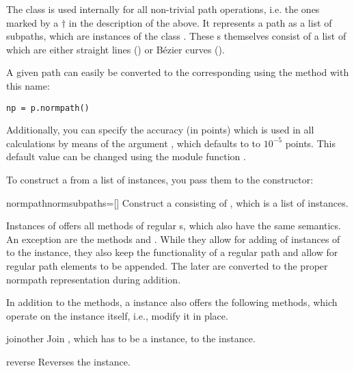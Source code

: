 \label{path:normpath}

The  class is used internally for all non-trivial path
operations, i.e. the ones marked by a $\dagger$ in the description of
the  above. It represents a path as a list of subpaths, which are
instances of the class . These s
themselves consist of a list of  which are
either straight lines () or B\'ezier curves
(). 

A given path can easily be converted to the corresponding 
using the method with this name:
\begin{verbatim}
np = p.normpath()
\end{verbatim}
Additionally, you can specify the accuracy (in points) which is used
in all  calculations by means of the argument
, which defaults to to $10^{-5}$ points. This default
value can be changed using the module function . 

To construct a  from a list of 
instances, you pass them to the  constructor:

\begin{classdesc}{normpath}{normsubpaths=[]}
  Construct a  consisting of , which
  is a list of  instances. 
\end{classdesc}

Instances of  offers all methods of regular
s, which also have the same semantics. An exception are
the methods  and . While they allow for
adding of instances of  to the 
instance, they also keep the functionality of a regular path and allow
for regular path elements to be appended. The later are converted to
the proper normpath representation during addition. 

In addition to the  methods, a  instance
also offers the following methods, which operate on the instance
itself, i.e., modify it in place. 

\begin{methoddesc}{join}{other}
  Join , which has to be a  instance, to
  the  instance. 
\end{methoddesc}

\begin{methoddesc}{reverse}{}
  Reverses the  instance. 
\end{methoddesc}

